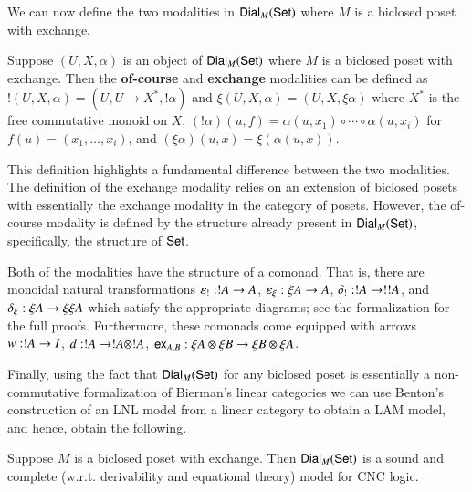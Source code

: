 We can now define the two modalities in $\mathsf{Dial}_{M}(\mathsf{Set})$ where $M$ is
a biclosed poset with exchange.
\begin{definition}
  \label{def:modalities-dial}
  Suppose $(U, X, \alpha)$ is an object of $\mathsf{Dial}_{M}(\mathsf{Set})$ where $M$
  is a biclosed poset with exchange. Then the \textbf{of-course} and
  \textbf{exchange} modalities can be defined as 
  $! (U, X, \alpha) = (U, U \to X^*, !\alpha)$ and
  $\xi (U, X, \alpha) = (U, X, \xi \alpha)$
  where $X^*$ is the free commutative monoid on $X$, $(!\alpha)(u, f)
  = \alpha(u, x_1) \circ \cdots \circ \alpha(u, x_i)$ for $f(u) =
  (x_1, \ldots, x_i)$, and $(\xi \alpha)(u, x) = \xi (\alpha(u,
  x))$.
\end{definition}
This definition highlights a fundamental difference between the two
modalities.  The definition of the exchange modality relies on an
extension of biclosed posets with essentially the exchange modality in
the category of posets.  However, the of-course modality is defined by
the structure already present in $\mathsf{Dial}_{M}(\mathsf{Set})$, specifically, the
structure of $\mathsf{Set}$.

Both of the modalities have the structure of a comonad.  That is,
there are monoidal natural transformations $\varepsilon_! : !A \rightarrow
A$, $\varepsilon_\xi : \xi A \rightarrow A$, $\delta_! : !A \rightarrow !!A$,
and $\delta_\xi : \xi A \rightarrow \xi\xi A$ which satisfy the
appropriate diagrams; see the formalization for the full
proofs. Furthermore, these comonads come equipped with arrows $w : !A
\rightarrow I$, $d : !A \rightarrow !A \otimes !A$, $\mathsf{ex}_{A,B} : \xi A \otimes \xi B \rightarrow \xi B
\otimes \xi A$. 

Finally, using the fact that $\mathsf{Dial}_{M}(\mathsf{Set})$ for any biclosed poset
is essentially a non-commutative formalization of Bierman's linear
categories \cite{Bierman:1994} we can use Benton's construction of an
LNL model from a linear category to obtain a LAM model, and hence,
obtain the following.
\begin{theorem}
  \label{theorem:sound-dial-exchange-!}
  Suppose $M$ is a biclosed poset with exchange.  Then
  $\mathsf{Dial}_{M}(\mathsf{Set})$ is a sound and complete (w.r.t. derivability and
  equational theory) model for CNC logic.
\end{theorem}

